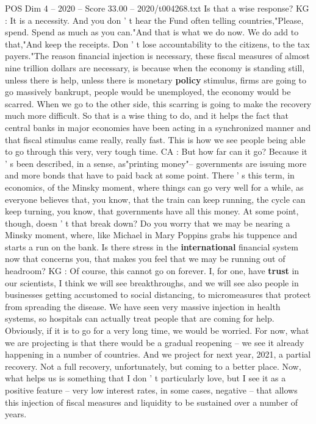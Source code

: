 \begin{textsample}{POS Dim 4 – 2020 – Score 33.00 – 2020/t004268.txt}
Is that a wise response?
KG : It is a necessity.
And you don ' t hear the Fund often telling countries,"Please, spend.
Spend as much as you can."And that is what we do now.
We do add to that,"And keep the receipts.
Don ' t lose accountability to the citizens, to the tax payers."The reason financial injection is necessary, these fiscal measures of almost nine trillion dollars are necessary, is because when the economy is standing still, unless there is help, unless there is monetary \textbf{policy} stimulus, firms are going to go massively bankrupt, people would be unemployed, the economy would be scarred.
When we go to the other side, this scarring is going to make the recovery much more difficult.
So that is a wise thing to do, and it helps the fact that central banks in major economies have been acting in a synchronized manner and that fiscal stimulus came really, really fast.
This is how we see people being able to go through this very, very tough time.
CA : But how far can it go?
Because it ' s been described, in a sense, as"printing money"-- governments are issuing more and more bonds that have to paid back at some point.
There ' s this term, in economics, of the Minsky moment, where things can go very well for a while, as everyone believes that, you know, that the train can keep running, the cycle can keep turning, you know, that governments have all this money.
At some point, though, doesn ' t that break down?
Do you worry that we may be nearing a Minsky moment, where, like Michael in Mary Poppins grabs his tuppence and starts a run on the bank.
Is there stress in the \textbf{international} financial system now that concerns you, that makes you feel that we may be running out of headroom?
KG : Of course, this cannot go on forever.
I, for one, have \textbf{trust} in our scientists, I think we will see breakthroughs, and we will see also people in businesses getting accustomed to social distancing, to micromeasures that protect from spreading the disease.
We have seen very massive injection in health systems, so hospitals can actually treat people that are coming for help.
Obviously, if it is to go for a very long time, we would be worried.
For now, what we are projecting is that there would be a gradual reopening -- we see it already happening in a number of countries.
And we project for next year, 2021, a partial recovery.
Not a full recovery, unfortunately, but coming to a better place.
Now, what helps us is something that I don ' t particularly love, but I see it as a positive feature -- very low interest rates, in some cases, negative -- that allows this injection of fiscal measures and liquidity to be sustained over a number of years.

\end{textsample}
